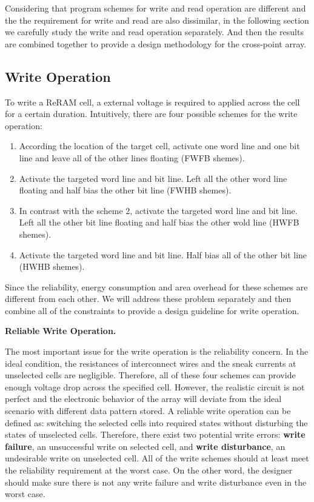 Considering that program schemes for write and read operation are
different and the the requirement for write and read are also dissimilar,
in the following section we carefully study the write and read operation
separately. And then the results are combined together to provide a design
methodology for the cross-point array.

\subsection{Write Operation}
To write a ReRAM cell, a external voltage is required to applied across the cell for a certain duration. Intuitively, there are four possible schemes for the write operation:
\begin{enumerate}
  \item According the location of the target cell, activate one word line and one bit line and leave all of the other lines floating (FWFB shemes).
  \item Activate the targeted word line and bit line. Left all the other word line floating and half bias the other bit line (FWHB shemes).
  \item In contrast with the scheme 2, activate the targeted word line and bit line. Left all the other bit line floating and half bias the other wold line (HWFB shemes).
  \item Activate the targeted word line and bit line. Half bias all of the other bit line (HWHB shemes).
\end{enumerate}
Since the reliability, energy consumption and area overhead for these
schemes are different from each other. We will address these problem
separately and then combine all of the constraints to provide a design
guideline for write operation.

\vspace{10pt} \textbf{Reliable Write Operation.} \vspace{8pt}

The most important issue for the write operation is the reliability
concern. In the ideal condition, the resistances of interconnect wires and
the sneak currents at unselected cells are negligible. Therefore, all of
these four schemes can provide enough voltage drop across the specified
cell. However, the realistic circuit is not perfect and the electronic
behavior of the array will deviate from the ideal scenario with different
data pattern stored. A reliable write operation can be defined as:
switching the selected cells into required states without disturbing the
states of unselected cells. Therefore, there exist two potential write
errors: \textbf{write failure}, an unsuccessful write on selected cell,
and \textbf{write disturbance}, an undesirable write on unselected cell.
All of the write schemes should at least meet the reliability requirement
at the worst case. On the other word, the designer should make sure there
is not any write failure and write disturbance even in the worst case.

